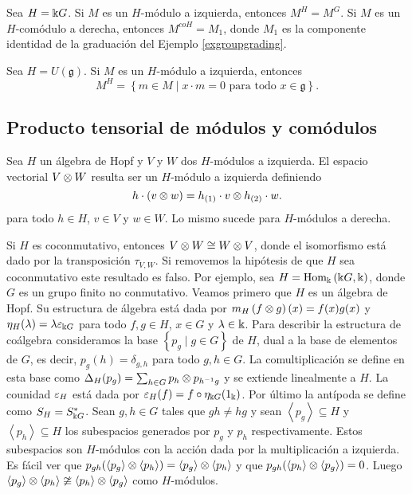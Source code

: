 \documentclass[a4paper,oneside,fleqn,11pt,../tesis.tex]{subfiles}
\begin{document}
\begin{example}
	Sea $H = \Bbbk G$. Si $M$ es un $H$-módulo a izquierda, entonces $M^{H} = M^{G}$. Si $M$ es un $H$-comódulo a derecha, entonces
	$M^{coH} = M_1$, donde $M_1$ es la componente identidad de la graduación del Ejemplo \ref{exgroupgrading}. 
\end{example}

\begin{example}
	Sea $H = U(\mathfrak{g})$. Si $M$ es un $H$-módulo a izquierda, entonces
	\[
		M^{H} = \left\lbrace m \in M \mid x \cdot m = 0 \text{ para todo } x \in \mathfrak{g} \right\rbrace.
	\]
\end{example}

\subsection{Producto tensorial de módulos y comódulos}

Sea $H$ un álgebra de Hopf y $V$ y $W$ dos $H$-módulos a izquierda. El espacio vectorial $V \otimes W$ resulta ser un $H$-módulo a izquierda definiendo
\[
	h \cdot (v \otimes w) = h_{(1)} \cdot v \otimes h_{(2)} \cdot w.	
\]
para todo $h \in H$, $v \in V$ y $w \in W$. Lo mismo sucede para $H$-módulos a derecha.
	
Si $H$ es coconmutativo, entonces $V \otimes W \cong W \otimes V$, donde el isomorfismo está dado por la transposición $\tau_{V, W}$.
Si removemos la hipótesis de que $H$ sea coconmutativo este resultado es falso. Por ejemplo, sea $H = \operatorname{Hom}_{\Bbbk}\left(\Bbbk G, \Bbbk\right)$,
donde $G$ es un grupo finito no conmutativo. Veamos primero que $H$ es un álgebra de Hopf. Su estructura de álgebra está dada por 
$m_{H}\left(f \otimes g\right)(x) = f(x)g(x)$ y $\eta_{H}(\lambda) = \lambda\varepsilon_{\Bbbk G}$ para todo $f, g \in H$, $x \in G$ y $\lambda \in \Bbbk$.
Para describir la estructura de coálgebra consideramos la base $\left\lbrace p_g \mid g \in G \right\rbrace$ de $H$, dual a la base de elementos de $G$, es decir, $p_g(h) = \delta_{g, h}$ para todo $g, h \in G$. La comultiplicación se define en esta base como $\Delta_H(p_g) = \sum_{h \in G} p_h \otimes p_{h^{-1}g}$ y se extiende linealmente a $H$. La counidad $\varepsilon_{H}$ está dada por $\varepsilon_{H}(f) = f \circ \eta_{\Bbbk G}(1_{\Bbbk})$. Por último la
antípoda se define como $S_{H} = S_{\Bbbk G}^{\ast}$. Sean $g, h \in G$ tales que $gh \neq hg$ y sean
$\left\langle p_g \right\rangle \subseteq H$ y $\left\langle p_h \right\rangle \subseteq H$ los subespacios generados por $p_g$ y $p_h$ respectivamente.
Estos subespacios son $H$-módulos con la acción dada por la multiplicación a izquierda. Es fácil ver que
$p_{gh}(\left\langle p_g \right\rangle \otimes \left\langle p_h \right\rangle) = \left\langle p_g \right\rangle \otimes \left\langle p_h \right\rangle$ y que
$p_{gh}(\left\langle p_h \right\rangle \otimes \left\langle p_g \right\rangle) = 0$. Luego
$\left\langle p_g \right\rangle \otimes \left\langle p_h \right\rangle \ncong \left\langle p_h \right\rangle \otimes \left\langle p_g \right\rangle$
como $H$-módulos.
\end{document}
